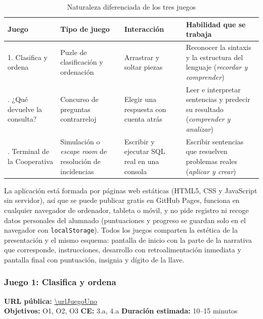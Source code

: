 \documentclass[11pt,a4paper]{article}
\begin{document}
\begin{table}[H]
\centering\small
\begin{tabularx}{\linewidth}{@{}l>{\raggedright}p{2.7cm}>{\raggedright}p{3.2cm}>{\raggedright\arraybackslash}X@{}}
\toprule
\textbf{Juego} & \textbf{Tipo de juego} & \textbf{Interacción} & \textbf{Habilidad que se trabaja} \\
\midrule
1. Clasifica y ordena & Puzle de clasificación y ordenación & Arrastrar y soltar piezas &
Reconocer la sintaxis y la estructura del lenguaje (\emph{recordar y comprender}) \\
\addlinespace
2. ¿Qué devuelve la consulta? & Concurso de preguntas contrarreloj & Elegir una respuesta con
cuenta atrás & Leer e interpretar sentencias y predecir su resultado (\emph{comprender y
analizar}) \\
\addlinespace
3. Terminal de la Cooperativa & Simulación o \emph{escape room} de resolución de
incidencias & Escribir y ejecutar SQL real en una consola & Escribir sentencias que
resuelven problemas reales (\emph{aplicar y crear}) \\
\bottomrule
\end{tabularx}
\caption{Naturaleza diferenciada de los tres juegos}
\label{tab:juegos}
\end{table}

La aplicación está formada por páginas web estáticas (HTML5, CSS y JavaScript sin servidor),
así que se puede publicar gratis en GitHub Pages, funciona en cualquier navegador de
ordenador, tableta o móvil, y no pide registro ni recoge datos personales del alumnado (puntuaciones y
progreso se guardan solo en el navegador con \texttt{localStorage}). Todos los juegos
comparten la estética de la presentación y el mismo esquema:
pantalla de inicio con la parte de la narrativa que corresponde, instrucciones, desarrollo
con retroalimentación inmediata y pantalla final con puntuación, insignia y dígito de la llave.

\subsubsection{Juego 1: Clasifica y ordena}
\label{sec:juego1}

\begin{nota}
\textbf{URL pública:} \url{\urlJuegoUno}\\
\textbf{Objetivos:} O1, O2, O3 \quad \textbf{CE:} 3.a, 4.a \quad
\textbf{Duración estimada:} 10–15 minutos
\end{nota}
\end{document}
